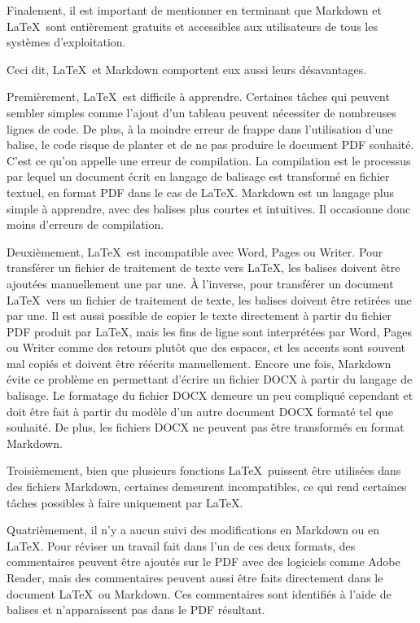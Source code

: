 \documentclass[
  letterpaper,
  DIV=11,
  numbers=noendperiod]{scrreprt}
\begin{document}
Finalement, il est important de mentionner en terminant que Markdown et
\LaTeX~sont entièrement gratuits et accessibles aux utilisateurs de tous
les systèmes d'exploitation.

Ceci dit, \LaTeX~et Markdown comportent eux aussi leurs désavantages.

Premièrement, \LaTeX~est difficile à apprendre. Certaines tâches qui
peuvent sembler simples comme l'ajout d'un tableau peuvent nécessiter de
nombreuses lignes de code. De plus, à la moindre erreur de frappe dans
l'utilisation d'une balise, le code risque de planter et de ne pas
produire le document PDF souhaité. C'est ce qu'on appelle une erreur de
compilation. La compilation est le processus par lequel un document
écrit en langage de balisage est transformé en fichier textuel, en
format PDF dans le cas de \LaTeX. Markdown est un langage plus simple à
apprendre, avec des balises plus courtes et intuitives. Il occasionne
donc moins d'erreurs de compilation.

Deuxièmement, \LaTeX~est incompatible avec Word, Pages ou Writer. Pour
transférer un fichier de traitement de texte vers \LaTeX, les balises
doivent être ajoutées manuellement une par une. À l'inverse, pour
transférer un document \LaTeX~vers un fichier de traitement de texte,
les balises doivent être retirées une par une. Il est aussi possible de
copier le texte directement à partir du fichier PDF produit par \LaTeX,
mais les fins de ligne sont interprétées par Word, Pages ou Writer comme
des retours plutôt que des espaces, et les accents sont souvent mal
copiés et doivent être réécrits manuellement. Encore une fois, Markdown
évite ce problème en permettant d'écrire un fichier DOCX à partir du
langage de balisage. Le formatage du fichier DOCX demeure un peu
compliqué cependant et doit être fait à partir du modèle d'un autre
document DOCX formaté tel que souhaité. De plus, les fichiers DOCX ne
peuvent pas être transformés en format Markdown.

Troisièmement, bien que plusieurs fonctions \LaTeX~puissent être
utilisées dans des fichiers Markdown, certaines demeurent incompatibles,
ce qui rend certaines tâches possibles à faire uniquement par \LaTeX.

Quatrièmement, il n'y a aucun suivi des modifications en Markdown ou en
\LaTeX. Pour réviser un travail fait dans l'un de ces deux formats, des
commentaires peuvent être ajoutés sur le PDF avec des logiciels comme
Adobe Reader, mais des commentaires peuvent aussi être faits directement
dans le document \LaTeX~ou Markdown. Ces commentaires sont identifiés à
l'aide de balises et n'apparaissent pas dans le PDF résultant.
\end{document}
